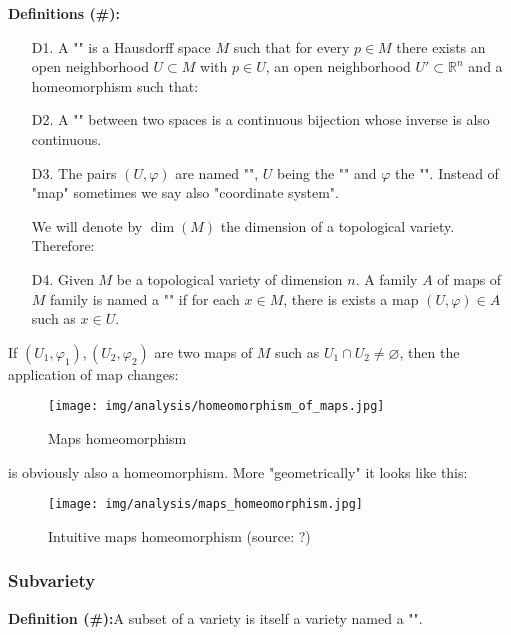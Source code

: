 	\textbf{Definitions (\#\mydef):}
	\begin{enumerate}
		\item[D1.] A "" is a Hausdorff space $M$ such that for every $p\in M$ there exists an open neighborhood $U\subset M$ with $p\in U$, an open neighborhood $U' \subset \mathbb{R}^n$ and a homeomorphism such that:
		
		\item[D2.] A "" between two spaces is a continuous bijection whose inverse is also continuous.

		\item[D3.] The pairs $(U,\varphi)$ are named "", $U$ being the "" and $\varphi$ the "". Instead of "map" sometimes we say also "coordinate system".

		\begin{tcolorbox}[title=Remark,colframe=black,arc=10pt]
		We will denote by $\dim(M)$ the dimension of a topological variety. Therefore:
		
		\end{tcolorbox}
	
		\item[D4.] Given $M$ be a topological variety of dimension $n$. A family $A$ of maps of $M$ family is named a  "" if for each $x\in M$, there is exists a map $(U, \varphi)\in A$ such as $x\in U$.
	\end{enumerate}
	If $(U_1,\varphi_1),(U_2,\varphi_2)$ are two maps of $M$ such as $U_1\cap U_2\neq \varnothing$, then the application of map changes:
	
	\begin{figure}[H]
		\centering
		\texttt{[image: img/analysis/homeomorphism\_of\_maps.jpg]}
		\caption{Maps homeomorphism}
	\end{figure}
	is obviously also a homeomorphism. More "geometrically" it looks like this:
	\begin{figure}[H]
		\centering
		\texttt{[image: img/analysis/maps\_homeomorphism.jpg]}
		\caption{Intuitive maps homeomorphism (source: ?)}
	\end{figure}
	
	\pagebreak
	\subsubsection{Subvariety}
	\textbf{Definition (\#\mydef):}A subset of a variety is itself a variety named a "\label{subvariety}". 


